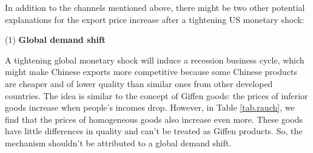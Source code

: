 In addition to the channels mentioned above, there might be two other potential explanations for the export price increase after a tightening US monetary shock:

(1) \textbf{Global demand shift} 

A tightening global monetary shock will induce a recession business cycle, which might make Chinese exports more competitive because some Chinese products are cheaper and of lower quality than similar ones from other developed countries. The idea is similar to the concept of Giffen goods: the prices of inferior goods increase when people's incomes drop. However, in Table \ref{tab.rauch}, we find that the prices of homogeneous goods also increase even more. These goods have little differences in quality and can't be treated as Giffen products. So, the mechanism shouldn't be attributed to a global demand shift.


